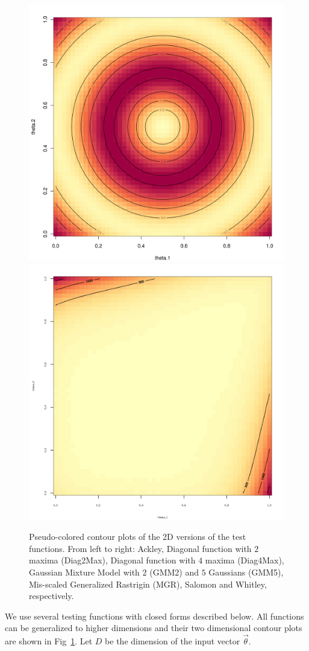 \begin{figure}[htbp]
\begin{center}
\includegraphics[width=0.24\linewidth]{figs/chap5/Salomon.png}
\includegraphics[width=0.24\linewidth]{figs/chap5/Whitley.png}
\caption{Pseudo-colored contour plots of the 2D versions of the test functions.
%
From left to right: Ackley, Diagonal function with $2$ maxima (Diag2Max), Diagonal function with $4$ maxima (Diag4Max), Gaussian Mixture Model with $2$ (GMM2) and $5$ Gaussians (GMM5), Mis-scaled Generalized Rastrigin (MGR), Salomon and Whitley, respectively.}
\label{fig:original}
\end{center}
\end{figure}

We use several testing functions with closed forms described below.
%
All functions can be generalized to higher dimensions and their two dimensional contour plots are shown in Fig~\ref{fig:original}.
%
Let $D$ be the dimension of the input vector $\vec{\theta}$.


